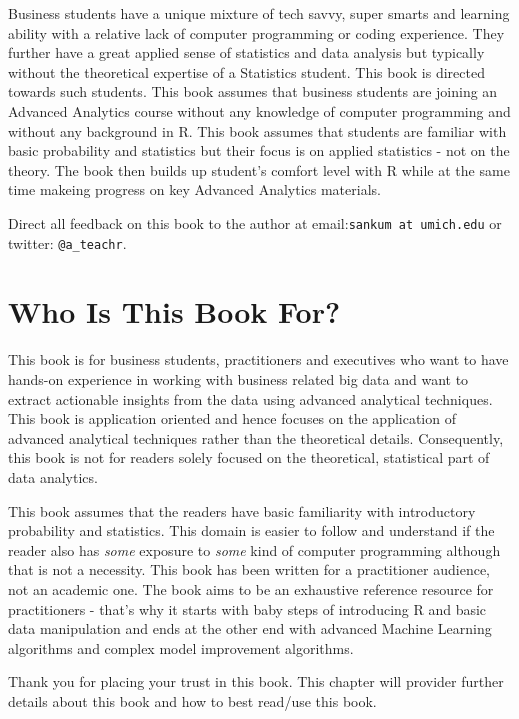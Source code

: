 \documentclass[]{krantz}
\theoremstyle{definition}
\theoremstyle{definition}
\theoremstyle{definition}
\theoremstyle{remark}
\begin{document}
Business students have a unique mixture of tech savvy, super smarts and
learning ability with a relative lack of computer programming or coding
experience. They further have a great applied sense of statistics and
data analysis but typically without the theoretical expertise of a
Statistics student. This book is directed towards such students. This
book assumes that business students are joining an Advanced Analytics
course without any knowledge of computer programming and without any
background in R. This book assumes that students are familiar with basic
probability and statistics but their focus is on applied statistics -
not on the theory. The book then builds up student's comfort level with
R while at the same time makeing progress on key Advanced Analytics
materials.

Direct all feedback on this book to the author at
email:\texttt{sankum\ at\ umich.edu} or twitter: \texttt{@a\_teachr}.

\section*{Who Is This Book For?}\label{who-is-this-book-for}


This book is for business students, practitioners and executives who
want to have hands-on experience in working with business related big
data and want to extract actionable insights from the data using
advanced analytical techniques. This book is application oriented and
hence focuses on the application of advanced analytical techniques
rather than the theoretical details. Consequently, this book is not for
readers solely focused on the theoretical, statistical part of data
analytics.

This book assumes that the readers have basic familiarity with
introductory probability and statistics. This domain is easier to follow
and understand if the reader also has \emph{some} exposure to
\emph{some} kind of computer programming although that is not a
necessity. This book has been written for a practitioner audience, not
an academic one. The book aims to be an exhaustive reference resource
for practitioners - that's why it starts with baby steps of introducing
R and basic data manipulation and ends at the other end with advanced
Machine Learning algorithms and complex model improvement algorithms.

Thank you for placing your trust in this book. This chapter will
provider further details about this book and how to best read/use this
book.
\end{document}
